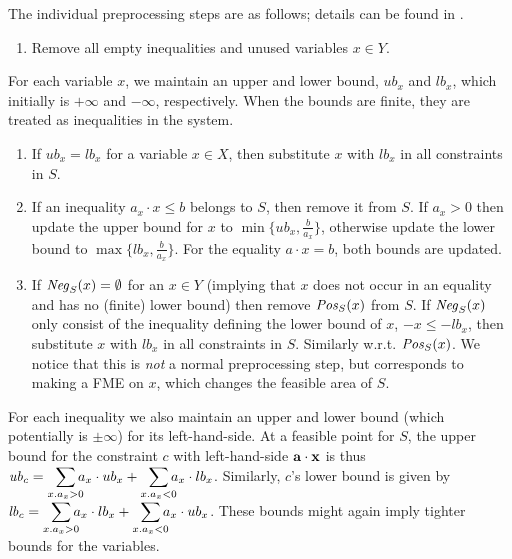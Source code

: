 The individual preprocessing steps are as follows; details can be found in \cite{MyTechRep}.
%
\begin{enumerate} \itemsep0em
	\item Remove all empty inequalities and unused variables $x\in Y$.
\setcounter{counterName}{\value{enumi}}
\end{enumerate}
For each variable $x$, we maintain an upper and lower bound, $ub_x$ and $lb_x$, which initially is $+\infty$ and $-\infty$, respectively. When the bounds are finite, they are treated as inequalities in the system.
\begin{enumerate} \itemsep0em
\setcounter{enumi}{\value{counterName}}
	\item If $ub_x = lb_x$ for a variable $x\in X$, then substitute $x$ with $lb_x$ in all constraints in $S$. 
	\item If an inequality $a_x\cdot x \leq b$ belongs to $S$, then remove it from $S$. If $a_x>0$ then update the upper bound for $x$ to $\min\{ub_x,\frac{b}{a_x}\}$, otherwise update the lower bound to $\max\{lb_x,\frac{b}{a_x}\}$.
For the equality $a\cdot x = b$, both bounds are updated.
	\item If $\mathit{Neg}_S(x)=\emptyset$ for an $x\in Y$ (implying that $x$ does not occur in an equality and has no (finite) lower bound) then remove $\mathit{Pos}_S(x)$ from $S$. If $\mathit{Neg}_S(x)$ only consist of the inequality defining the lower bound of $x$, $-x\leq -lb_x$, then substitute $x$ with $lb_x$ in all constraints in $S$. Similarly w.r.t. $\mathit{Pos}_S(x)$. We notice that this is \emph{not} a normal preprocessing step, but corresponds to making a FME on $x$, which changes the feasible area of $S$. 
\setcounter{counterName}{\value{enumi}}
\end{enumerate}
For each inequality we also maintain an upper and lower bound (which potentially is $\pm \infty$) for its left-hand-side. At a feasible point for $S$, the upper bound for the constraint $c$ with left-hand-side $\mathbf{a}\cdot\mathbf{x}$ is thus $\mi{ub}_c = \smashoperator[r]{\sum_{x. a_x>0}}a_x\cdot ub_x + \smashoperator[r]{\sum_{x.a_x<0}}a_x\cdot lb_x$. Similarly, $c$'s lower bound is given by $\mi{lb}_c = \smashoperator[r]{\sum_{x.a_x>0}}a_x\cdot lb_x + \smashoperator[r]{\sum_{x.a_x<0}}a_x\cdot ub_x$.
These bounds might again imply tighter bounds for the variables. 
